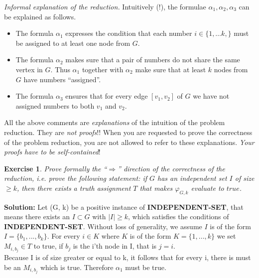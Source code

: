 \documentclass [10pt]{article}
\newcommand{\true}{true}
\newtheorem{exercise}[theorem]{Exercise}
\renewcommand{\phi}{\varphi}
\begin{document}
{\em Informal explanation of the reduction.}
Intuitively (!), the formulae $\alpha_1,\alpha_2,\alpha_3$
can be explained as follows. 
%
\begin{itemize}
\item The formula $\alpha_1$ expresses the condition that each number $i\in
  \{1,\ldots k,\}$ must be assigned to at least one node from $G$.
\item The formula $\alpha_2$ makes sure that a pair of numbers do not share
  the same vertex in $G$. Thus $\alpha_1$ together with $\alpha_2$ make sure
  that at least $k$ nodes from $G$ have numbers ``assigned''.

\item The formula $\alpha_3$ ensures that for every edge $[v_1,v_2]$ of $G$ we
  have not assigned numbers to both $v_1$ and $v_2$.
\end{itemize}

 All the above comments are {\em explanations\/} of the
intuition of the problem reduction. They are {\em not proofs\/}!! When you are
requested to prove the correctness of the problem reduction, you are not
allowed to refer to these explanations. {\em Your proofs have to be
  self-contained\/}!

\begin{exercise}
  Prove formally the ``$\Rightarrow$'' direction of the correctness of
  the reduction, i.e.  prove the following statement: if $G$ has an
  independent set $I$ of size $\geq k$, then there exists a truth
  assignment $T$ that makes $\phi_{G,k}$ evaluate to $\true$.
\end{exercise}

\medskip

\textbf{Solution:} Let (G, k) be a positive instance of \textbf{INDEPENDENT-SET}, that means there exists an $I \subset G$ with $|I| \geq k$, which satisfies the conditions of \textbf{INDEPENDENT-SET}. Without loss of generality, we assume $I$ is of the form $I=\{b_1, ..., b_k\}$.
For every $i \in K$ where $K$ is of the form $K=\{1, ..., k\}$ we set $M_{i,b_j} \in T$ to true, if $b_j$ is the i'th node in I, that is $j=i$.\\

Because I is of size greater or equal to k, it follows that for every i, there is must be an $M_{i,b_j}$ which is true. Therefore $\alpha_1$ must be true.
\end{document}
